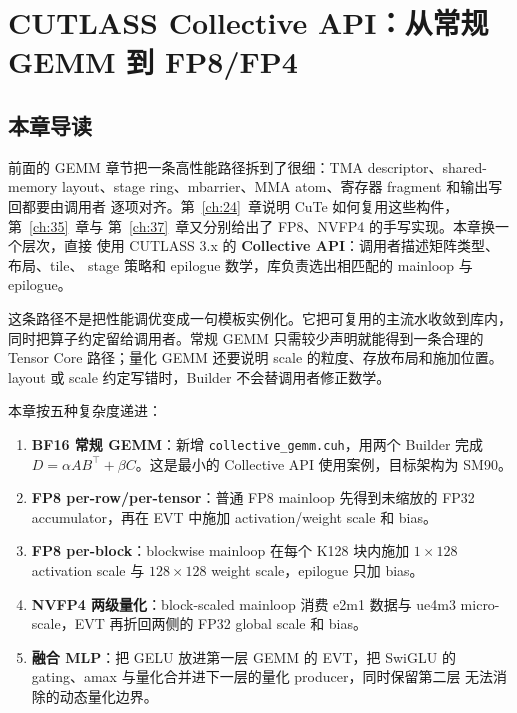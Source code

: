 \chapter{CUTLASS Collective API：从常规 GEMM 到 FP8/FP4}\label{ch:41}

\section{本章导读}

前面的 GEMM 章节把一条高性能路径拆到了很细：TMA descriptor、shared-memory
layout、stage ring、mbarrier、MMA atom、寄存器 fragment 和输出写回都要由调用者
逐项对齐。第~\ref{ch:24}~章说明 CuTe 如何复用这些构件，第~\ref{ch:35}~章与
第~\ref{ch:37}~章又分别给出了 FP8、NVFP4 的手写实现。本章换一个层次，直接
使用 CUTLASS 3.x 的 \textbf{Collective API}：调用者描述矩阵类型、布局、tile、
stage 策略和 epilogue 数学，库负责选出相匹配的 mainloop 与 epilogue。

这条路径不是把性能调优变成一句模板实例化。它把可复用的主流水收敛到库内，
同时把算子约定留给调用者。常规 GEMM 只需较少声明就能得到一条合理的 Tensor
Core 路径；量化 GEMM 还要说明 scale 的粒度、存放布局和施加位置。layout 或
scale 约定写错时，Builder 不会替调用者修正数学。

本章按五种复杂度递进：
\begin{enumerate}[itemsep=1pt,topsep=2pt]
  \item \textbf{BF16 常规 GEMM}：新增 \texttt{collective\_}\allowbreak\texttt{gemm.cuh}，用两个
        Builder 完成 $D=\alpha AB^{\top}+\beta C$。这是最小的 Collective API
        使用案例，目标架构为 SM90。
  \item \textbf{FP8 per-row/per-tensor}：普通 FP8 mainloop 先得到未缩放的
        FP32 accumulator，再在 EVT 中施加 activation/weight scale 和 bias。
  \item \textbf{FP8 per-block}：blockwise mainloop 在每个 K128 块内施加
        $1\times128$ activation scale 与 $128\times128$ weight scale，epilogue
        只加 bias。
  \item \textbf{NVFP4 两级量化}：block-scaled mainloop 消费 e2m1 数据与
        ue4m3 micro-scale，EVT 再折回两侧的 FP32 global scale 和 bias。
  \item \textbf{融合 MLP}：把 GELU 放进第一层 GEMM 的 EVT，把 SwiGLU 的
        gating、amax 与量化合并进下一层的量化 producer，同时保留第二层
        无法消除的动态量化边界。
\end{enumerate}

